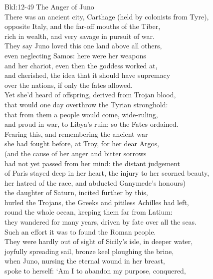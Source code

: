\documentclass[10pt, a5paper, titlepage]{minimal}
\begin{document}
{BkI:12-49 The Anger of Juno}\\
There was an ancient city, Carthage (held by colonists from Tyre),\\
opposite Italy, and the far-off mouths of the Tiber,\\
rich in wealth, and very savage in pursuit of war.\\
They say Juno loved this one land above all others,\\
even neglecting Samos: here were her weapons\\
and her chariot, even then the goddess worked at,\\
and cherished, the idea that it should have supremacy\\
over the nations, if only the fates allowed.\\
Yet she'd heard of offspring, derived from Trojan blood,\\
that would one day overthrow the Tyrian stronghold:\\
that from them a people would come, wide-ruling,\\
and proud in war, to Libya's ruin: so the Fates ordained.\\
Fearing this, and remembering the ancient war\\
she had fought before, at Troy, for her dear Argos,\\
(and the cause of her anger and bitter sorrows\\
had not yet passed from her mind: the distant judgement\\
of Paris stayed deep in her heart, the injury to her scorned beauty,\\
her hatred of the race, and abducted Ganymede's honours)\\
the daughter of Saturn, incited further by this,\\
hurled the Trojans, the Greeks and pitiless Achilles had left,\\
round the whole ocean, keeping them far from Latium:\\
they wandered for many years, driven by fate over all the seas.\\
Such an effort it was to found the Roman people.\\
They were hardly out of sight of Sicily's isle, in deeper water,\\
joyfully spreading sail, bronze keel ploughing the brine,\\
when Juno, nursing the eternal wound in her breast,\\
spoke to herself: `Am I to abandon my purpose, conquered,\\
\end{document}
